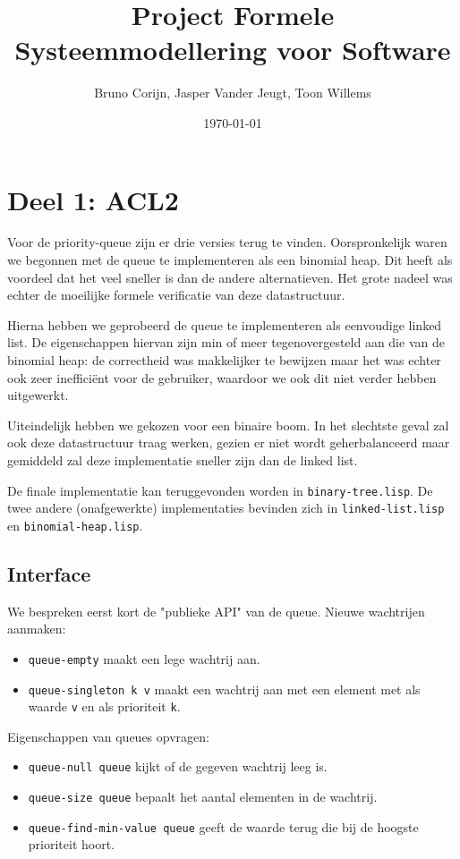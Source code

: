 \documentclass[a4paper,10pt]{article}
\title{Project Formele Systeemmodellering voor Software}
\author{Bruno Corijn, Jasper Vander Jeugt, Toon Willems}
\date{\today}
\begin{document}
\maketitle

\section{Deel 1: ACL2}

Voor de priority-queue zijn er drie versies terug te vinden. Oorspronkelijk
waren we begonnen met de queue te implementeren als een binomial heap. Dit heeft
als voordeel dat het veel sneller is dan de andere alternatieven. Het grote
nadeel was echter de moeilijke formele verificatie van deze datastructuur.

Hierna hebben we geprobeerd de queue te implementeren als eenvoudige linked
list. De eigenschappen hiervan zijn min of meer tegenovergesteld aan die van de
binomial heap: de correctheid was makkelijker te bewijzen maar het was echter
ook zeer ineffici\"ent voor de gebruiker, waardoor we ook dit niet verder hebben
uitgewerkt.

Uiteindelijk hebben we gekozen voor een binaire boom. In het slechtste geval zal
ook deze datastructuur traag werken, gezien er niet wordt geherbalanceerd maar
gemiddeld zal deze implementatie sneller zijn dan de linked list.

De finale implementatie kan teruggevonden worden in \texttt{binary-tree.lisp}.
De twee andere (onafgewerkte) implementaties bevinden zich in
\texttt{linked-list.lisp} en \texttt{binomial-heap.lisp}.

\subsection{Interface}

We bespreken eerst kort de "publieke API" van de queue. Nieuwe wachtrijen
aanmaken:

\begin{itemize}
    \item \texttt{queue-empty} maakt een lege wachtrij aan.
    \item \texttt{queue-singleton k v} maakt een wachtrij aan met een element
    met als waarde \texttt{v} en als prioriteit \texttt{k}.
\end{itemize}

Eigenschappen van queues opvragen:

\begin{itemize}
    \item \texttt{queue-null queue} kijkt of de gegeven wachtrij leeg is.
    \item \texttt{queue-size queue} bepaalt het aantal elementen in de wachtrij.
    \item \texttt{queue-find-min-value queue} geeft de waarde terug die bij de
    hoogste prioriteit hoort.
\end{itemize}
\end{document}
